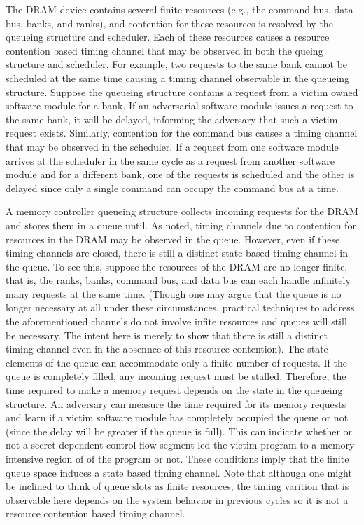 The DRAM device contains several finite resources (e.g., the command bus, data
bus, banks, and ranks), and contention for these resources is resolved by the 
queueing structure and scheduler. Each of these resources causes a resource 
contention based timing channel that may be observed in both the queing 
structure and scheduler. For example, two requests to the same bank cannot
be scheduled at the same time causing a timing channel observable in the 
queueing structure. Suppose the queueing structure contains a request from a 
victim owned software module for a bank. If an adversarial software module 
issues a request to the same bank, it will be delayed, informing the adversary 
that such a victim request exists.  Similarly, contention for the command bus 
causes a timing channel that may be observed in the scheduler. If a request 
from one software module arrives at the scheduler in the same cycle as a 
request from another software module and for a different bank, one of the 
requests is scheduled and the other is delayed since only a single command can 
occupy the command bus at a time.

A memory controller queueing structure collects incoming requests for the DRAM 
and stores them in a queue until. As noted, timing channels due to contention 
for resources in the
DRAM may be observed in the queue. However, even if these timing channels are 
closed, there is still a distinct state based timing channel in the queue. To 
see this, suppose the resources of the DRAM are no longer finite, that is, the 
ranks, banks, command bus, and data bus can each handle infinitely many 
requests at the same time. (Though one may argue that the queue is no longer 
necessary at all under these circumstances, practical techniques to address the 
aforementioned channels do not involve infite resources and queues will still 
be necessary. The intent here is merely to show that there is still a distinct 
timing channel even in the absennce of this resource contention).
The state elements of the queue can accommodate only a finite number of 
requests. If the queue is completely filled, any incoming request must be 
stalled. Therefore, the time required to make a memory request depends on the 
state in the queueing structure. An adversary can measure the time required for 
its memory requests and learn if a victim software module has completely 
occupied the queue or not (since the delay will be greater if the queue is 
full). This can indicate whether or not a secret dependent control flow segment 
led the victim program to a memory intensive region of of the program or not.  
These conditions imply that the finite queue space induces a state based timing 
channel. Note that although one might be inclined to think of queue slots as 
finite resources, the timing varition that is observable here depends on the 
system behavior in previous cycles so it is not a resource contention based 
timing channel.

